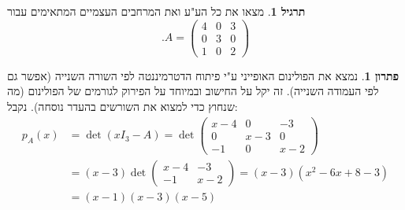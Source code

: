 \documentclass[12pt]{report}
\theoremstyle{plain}
\theoremstyle{definition}
\newtheorem{exercise}{תרגיל}[chapter]
\newtheorem*{solution}{פתרון}
\newcommand{\0}{\mathbf{0}}
\begin{document}
\begin{exercise}
מצאו את כל הע"ע ואת המרחבים העצמיים המתאימים עבור
$$
.A=\begin{pmatrix}
4 & 0 & 3 \\
0 & 3 & 0 \\
1 & 0 & 2
\end{pmatrix}
$$
\end{exercise}

\begin{solution}
נמצא את הפולינום האופייני ע"י פיתוח הדטרמיננטה לפי השורה השנייה (אפשר גם לפי העמודה השנייה). זה יקל על החישוב ובמיוחד על הפירוק לגורמים של הפולינום (מה שנחוץ כדי למצוא את השורשים בהעדר נוסחה). נקבל:
$$
\begin{aligned}
p_A(x)&=\det(xI_3-A)=\det\begin{pmatrix}
x-4 & 0 & -3 \\
0 & x-3 & 0 \\
-1 & 0 & x-2
\end{pmatrix}\\
&=(x-3)\det\begin{pmatrix}
x-4 & -3 \\
-1 & x-2
\end{pmatrix}=(x-3)(x^2-6x+8-3)\\
&=(x-1)(x-3)(x-5)
\end{aligned}
$$


\end{solution}
\end{document}
